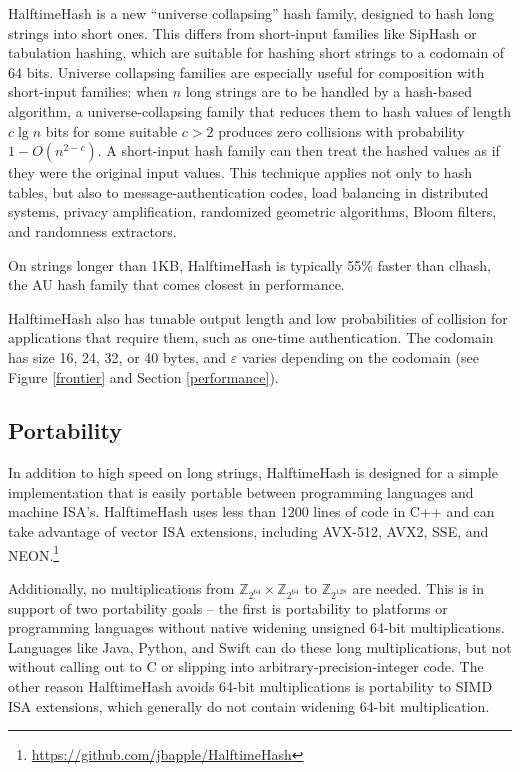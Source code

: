 \documentclass[runningheads]{llncs}
\newcommand{\ints}{\mathbb{Z}}
\begin{document}
HalftimeHash is a new ``universe collapsing'' hash family, designed to hash long strings into short ones. \cite{linear-hash-functions,hashing-without-primes-revisited,cuckoo-journal}
This differs from short-input families like SipHash or tabulation hashing, which are suitable for hashing short strings to a codomain of 64 bits. \cite{siphash,tabulation}
Universe collapsing families are especially useful for composition with short-input families: when $n$ long strings are to be handled by a hash-based algorithm, a universe-collapsing family that reduces them to hash values of length $c \lg n$ bits for some suitable $c > 2$ produces zero collisions with probability $1-O(n^{2-c})$.
A short-input hash family can then treat the hashed values as if they were the original input values. \cite{siphash,simple-hash-functions-work,universe-collapse-linear-probing,tabulation}
This technique applies not only to hash tables, but also to message-authentication codes, load balancing in distributed systems, privacy amplification, randomized geometric algorithms, Bloom filters, and randomness extractors. \cite{poly1305,simple-hash-functions-work,random-closest-pair,fuzzy-extractors,privacy-amplification,chord}

On strings longer than 1KB, HalftimeHash is typically 55\% faster than clhash, the AU hash family that comes closest in performance.

HalftimeHash also has tunable output length and low probabilities of collision for applications that require them, such as one-time authentication.\cite{nacl}
The codomain has size 16, 24, 32, or 40 bytes, and $\varepsilon$ varies depending on the codomain (see Figure \ref{frontier} and Section \ref{performance}).

\subsection{Portability}

In addition to high speed on long strings, HalftimeHash is designed for a simple implementation that is easily portable between programming languages and machine ISA's.
HalftimeHash uses less than 1200 lines of code in C++ and can take advantage of vector ISA extensions, including AVX-512, AVX2, SSE, and NEON.\footnote{\url{https://github.com/jbapple/HalftimeHash}}

Additionally, no multiplications from $\ints_{2^{64}} \times \ints_{2^{64}}$ to $\ints_{2^{128}}$ are needed.
This is in support of two portability goals -- the first is portability to platforms or programming languages without native widening unsigned 64-bit multiplications.
Languages like Java, Python, and Swift can do these long multiplications, but not without calling out to C or slipping into arbitrary-precision-integer code.
The other reason HalftimeHash avoids 64-bit multiplications is portability to SIMD ISA extensions, which generally do not contain widening 64-bit multiplication.
\end{document}
